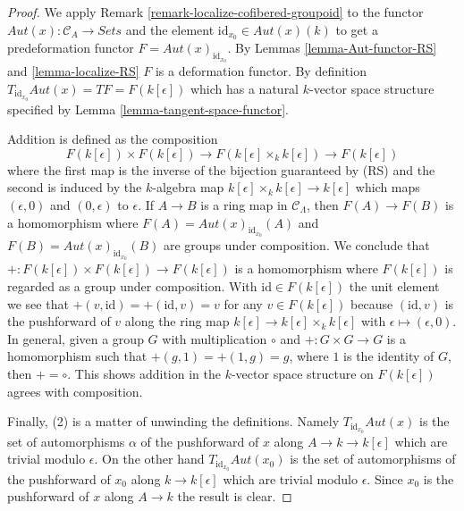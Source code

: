 \documentclass{stacks-project}
\theoremstyle{plain}
\theoremstyle{definition}
\theoremstyle{remark}
\numberwithin{equation}{subsection}
\begin{document}
\begin{proof}
We apply
Remark \ref{remark-localize-cofibered-groupoid}
to the functor $\mathit{Aut}(x) : \mathcal{C}_A \to \textit{Sets}$
and the element $\text{id}_{x_0} \in \mathit{Aut}(x)(k)$ to get
a predeformation functor $F = \mathit{Aut}(x)_{\text{id}_{x_0}}$. By
Lemmas \ref{lemma-Aut-functor-RS} and \ref{lemma-localize-RS}
$F$ is a deformation functor. By definition
$T_{\text{id}_{x_0}} \mathit{Aut}(x) = TF = F(k[\epsilon])$
which has a natural
$k$-vector space structure specified by Lemma
\ref{lemma-tangent-space-functor}.

\medskip\noindent
Addition is defined as the composition
$$
F(k[\epsilon]) \times F(k[\epsilon]) \longrightarrow
F(k[\epsilon] \times_k k[\epsilon]) \longrightarrow
F(k[\epsilon])
$$
where the first map is the inverse of the bijection guaranteed by (RS) and the
second is induced by the $k$-algebra map
$k[\epsilon] \times_k k[\epsilon] \to k[\epsilon]$
which maps $(\epsilon, 0)$ and $(0, \epsilon)$ to $\epsilon$.
If $A \to B$ is a ring map in $\mathcal{C}_\Lambda$, then $F(A) \to F(B)$
is a homomorphism where $F(A) = \mathit{Aut}(x)_{\text{id}_{x_0}}(A)$ and
$F(B) = \mathit{Aut}(x)_{\text{id}_{x_0}}(B)$ are groups under
composition. We conclude that
$+ : F(k[\epsilon]) \times F(k[\epsilon])\to F(k[\epsilon])$
is a homomorphism where $F(k[\epsilon])$ is regarded as a
group under composition. With $\text{id} \in F(k[\epsilon])$ the
unit element we see that $+(v, \text{id}) =
+(\text{id}, v) = v$ for any $v \in F(k[\epsilon])$ because
$(\text{id}, v)$ is the pushforward of $v$ along the ring map
$k[\epsilon] \to k[\epsilon] \times_k k[\epsilon]$ with
$\epsilon \mapsto (\epsilon, 0)$.
In general, given a group $G$ with multiplication $\circ$
and $+ : G \times G \to G$ is a homomorphism such that
$+(g, 1) = +(1, g) = g$, where $1$ is the identity of $G$, then $+ = \circ$.
This shows addition in the $k$-vector space structure on $F(k[\epsilon])$
agrees with composition.

\medskip\noindent
Finally, (2) is a matter of unwinding the definitions. Namely
$T_{\text{id}_{x_0}} \mathit{Aut}(x)$ is the set of
automorphisms $\alpha$ of the pushforward of $x$ along
$A \to k \to k[\epsilon]$ which are trivial modulo $\epsilon$.
On the other hand $T_{\text{id}_{x_0}} \mathit{Aut}(x_0)$ is the set of
automorphisms of the pushforward of $x_0$ along
$k \to k[\epsilon]$ which are trivial modulo $\epsilon$.
Since $x_0$ is the pushforward of $x$ along $A \to k$ the result
is clear.
\end{proof}
\end{document}
